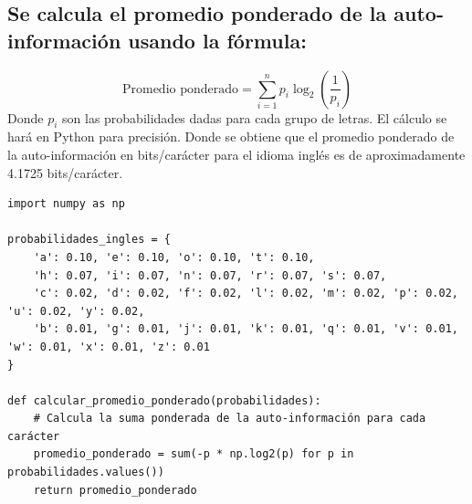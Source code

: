 \documentclass[
  11pt,
  letterpaper,
  answers
]{exam}
\begin{document}
\begin{questions}
\begin{solution}
\begin{parts}
\part{Se calcula el promedio ponderado de la auto-información usando la fórmula:}
\[ 
\text{Promedio ponderado} = \sum_{i=1}^{n} p_i \log_2 \left(\frac{1}{p_i}\right) 
\]
Donde \( p_i \) son las probabilidades dadas para cada grupo de letras. El cálculo se hará en Python para precisión. Donde se obtiene que el promedio ponderado de la auto-información en bits/carácter para el idioma inglés es de aproximadamente 4.1725 bits/carácter.
\begin{verbatim}
import numpy as np

probabilidades_ingles = {
    'a': 0.10, 'e': 0.10, 'o': 0.10, 't': 0.10,
    'h': 0.07, 'i': 0.07, 'n': 0.07, 'r': 0.07, 's': 0.07,
    'c': 0.02, 'd': 0.02, 'f': 0.02, 'l': 0.02, 'm': 0.02, 'p': 0.02, 'u': 0.02, 'y': 0.02,
    'b': 0.01, 'g': 0.01, 'j': 0.01, 'k': 0.01, 'q': 0.01, 'v': 0.01, 'w': 0.01, 'x': 0.01, 'z': 0.01
}

def calcular_promedio_ponderado(probabilidades):
    # Calcula la suma ponderada de la auto-información para cada carácter
    promedio_ponderado = sum(-p * np.log2(p) for p in probabilidades.values())
    return promedio_ponderado


\end{verbatim}
\end{parts}
\end{solution}
\end{questions}
\end{document}
